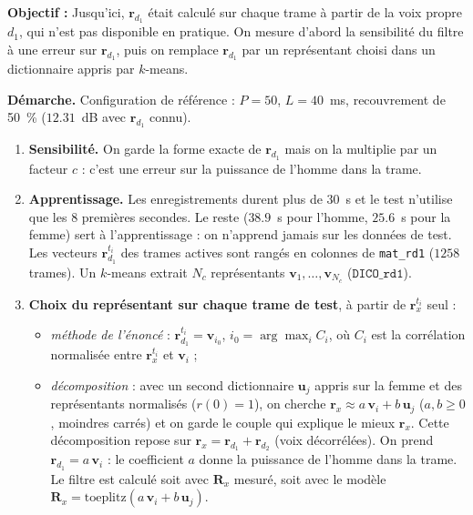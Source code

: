 \begin{enonce}
\textbf{Objectif :} Jusqu'ici, $\mathbf{r}_{d_1}$ était calculé sur chaque trame à partir de la voix propre $d_1$, qui n'est pas disponible en pratique. On mesure d'abord la sensibilité du filtre à une erreur sur $\mathbf{r}_{d_1}$, puis on remplace $\mathbf{r}_{d_1}$ par un représentant choisi dans un dictionnaire appris par $k$-means.
\end{enonce}

\textbf{Démarche.} Configuration de référence : $P=50$, $L=40$~ms, recouvrement de 50~\% ($12.31$~dB avec $\mathbf{r}_{d_1}$ connu).
\begin{enumerate}
  \item \textbf{Sensibilité.} On garde la forme exacte de $\mathbf{r}_{d_1}$ mais on la multiplie par un facteur $c$ : c'est une erreur sur la puissance de l'homme dans la trame.
  \item \textbf{Apprentissage.} Les enregistrements durent plus de $30$~s et le test n'utilise que les $8$ premières secondes. Le reste ($38.9$~s pour l'homme, $25.6$~s pour la femme) sert à l'apprentissage : on n'apprend jamais sur les données de test. Les vecteurs $\mathbf{r}_{d_1}^{t_i}$ des trames actives sont rangés en colonnes de \texttt{mat\_rd1} ($1258$ trames). Un $k$-means extrait $N_c$ représentants $\mathbf{v}_1,\dots,\mathbf{v}_{N_c}$ ($\texttt{DICO\_rd1}$).
  \item \textbf{Choix du représentant sur chaque trame de test}, à partir de $\mathbf{r}_x^{t_i}$ seul :
  \begin{itemize}
    \item \emph{méthode de l'énoncé} : $\mathbf{r}_{d_1}^{t_i}=\mathbf{v}_{i_0}$, $i_0=\arg\max_i C_i$, où $C_i$ est la corrélation normalisée entre $\mathbf{r}_x^{t_i}$ et $\mathbf{v}_i$ ;
    \item \emph{décomposition} : avec un second dictionnaire $\mathbf{u}_j$ appris sur la femme et des représentants normalisés ($r(0)=1$), on cherche $\mathbf{r}_x\approx a\,\mathbf{v}_i+b\,\mathbf{u}_j$ ($a,b\geq 0$, moindres carrés) et on garde le couple qui explique le mieux $\mathbf{r}_x$. Cette décomposition repose sur $\mathbf{r}_x=\mathbf{r}_{d_1}+\mathbf{r}_{d_2}$ (voix décorrélées). On prend $\mathbf{r}_{d_1}=a\,\mathbf{v}_i$ : le coefficient $a$ donne la puissance de l'homme dans la trame. Le filtre est calculé soit avec $\mathbf{R}_x$ mesuré, soit avec le modèle $\mathbf{R}_x=\mathrm{toeplitz}(a\,\mathbf{v}_i+b\,\mathbf{u}_j)$.
  \end{itemize}
\end{enumerate}


